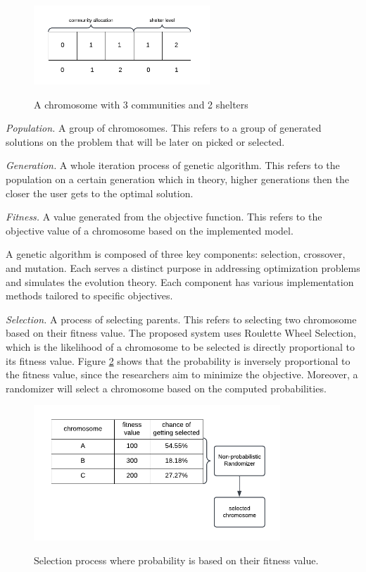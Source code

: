 	\begin{figure}[h!]
		\caption{A chromosome with 3 communities and 2 shelters}
		\centering
		\includegraphics[width=250px]{Chromosome}
		\label{Chromosome}
	\end{figure}
	
	\textit{Population.} A group of chromosomes. This refers to a group of generated solutions on the problem that will be later on picked or selected.
	
	\textit{Generation.} A whole iteration process of genetic algorithm. This refers to the population on a certain generation which in theory, higher generations then the closer the user gets to the optimal solution.
	
	\textit{Fitness.} A value generated from the objective function. This refers to the objective value of a chromosome based on the implemented model.
	
	A genetic algorithm is composed of three key components: selection, crossover, and mutation. Each serves a distinct purpose in addressing optimization problems and simulates the evolution theory. Each component has various implementation methods tailored to specific objectives. \parencite{Eyal2020}
	
	\textit{Selection.} A process of selecting parents. This refers to selecting two chromosome based on their fitness value. The proposed system uses Roulette Wheel Selection, which is the likelihood of a chromosome to be selected is directly proportional to its fitness value. Figure \ref{Selection} shows that the probability is inversely proportional to the fitness value, since the researchers aim to minimize the objective. Moreover, a randomizer will select a chromosome based on the computed probabilities.
	
	\begin{figure}[h!]
		\caption{Selection process where probability is based on their fitness value.}
		\centering
		\includegraphics[width=350px]{Selection}
		\label{Selection}
	\end{figure}
	
